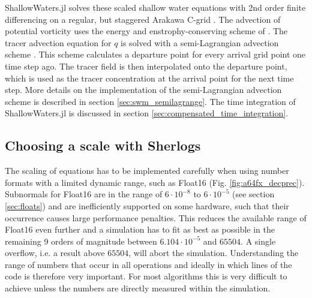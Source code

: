 ShallowWaters.jl solves these scaled shallow water equations with 2nd order finite differencing on a regular,
but staggered Arakawa C-grid \citep{Arakawa1977}. The advection of potential vorticity uses the energy
and enstrophy-conserving scheme of \cite{Arakawa1990}. The tracer advection equation for $q$ is solved
with a semi-Lagrangian advection scheme \citep{Diamantakis2013,Smolarkiewicz1992}. This scheme calculates
a departure point for every arrival grid point one time step ago. The tracer field is then interpolated onto the departure point,
which is used as the tracer concentration at the arrival point for the next time step. More details on the implementation of
the semi-Lagrangian advection scheme is described in section \ref{sec:swm_semilagrange}. The time integration of
ShallowWaters.jl is discussed in section \ref{sec:compensated_time_integration}.

\subsection{Choosing a scale with Sherlogs}
\label{sec:scale_sherlogs}

The scaling of equations has to be implemented carefully when using number formats with a limited dynamic range,
such as Float16 (Fig. \ref{fig:a64fx_decprec}). Subnormals for Float16 are in the range of $6 \cdot 10^{-8}$ to
$6 \cdot 10^{-5}$ (see section \ref{sec:floats}) and are inefficiently supported on some hardware, such that their occurrence
causes large performance penalties. This reduces the available range of Float16 even further and a simulation
has to fit as best as possible in the remaining 9 orders of magnitude between $6.104 \cdot 10^{-5}$ and $65504$.
A single overflow, i.e. a result above $65504$, will abort the simulation. Understanding the range of numbers
that occur in all operations and ideally in which lines of the code is therefore very important. 
For most algorithms this is very difficult to achieve unless the numbers are directly measured within the simulation. 

